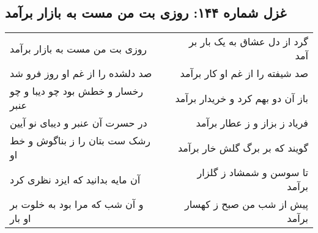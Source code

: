 \begin{center}
\section*{غزل شماره ۱۴۴: روزی بت من مست به بازار برآمد}
\label{sec:144}
\begin{longtable}{l p{0.5cm} r}
روزی بت من مست به بازار برآمد
&&
گرد از دل عشاق به یک بار بر آمد
\\
صد دلشده را از غم او روز فرو شد
&&
صد شیفته را از غم او کار برآمد
\\
رخسار و خطش بود چو دیبا و چو عنبر
&&
باز آن دو بهم کرد و خریدار برآمد
\\
در حسرت آن عنبر و دیبای نو آیین
&&
فریاد ز بزاز و ز عطار برآمد
\\
رشک ست بتان را ز بناگوش و خط او
&&
گویند که بر برگ گلش خار برآمد
\\
آن مایه بدانید که ایزد نظری کرد
&&
تا سوسن و شمشاد ز گلزار برآمد
\\
و آن شب که مرا بود به خلوت بر او بار
&&
پیش از شب من صبح ز کهسار برآمد
\\
\end{longtable}
\end{center}
